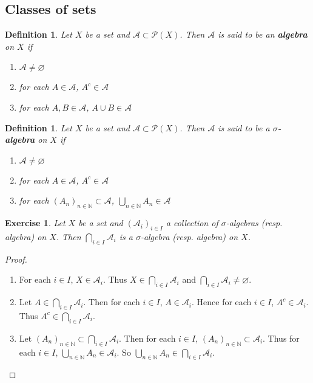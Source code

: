 \documentclass[12pt]{amsart}
\newtheorem{defn}[thm]{Definition}
\newtheorem{ex}[thm]{Exercise}
\newcommand{\sig}{\sigma}
\newcommand{\N}{\mathbb{N}}
\newcommand{\MA}{\mathcal{A}}
\newcommand{\MP}{\mathcal{P}}
\begin{document}
\subsection{Classes of sets}

\begin{defn}
Let $X$ be a set and $\MA \subset \MP(X)$. Then $\MA$ is said to be an \textbf{algebra} on $X$ if 
\begin{enumerate}
\item $\MA \neq \varnothing$
\item for each $A \in \MA$, $A^c \in \MA$
\item for each $A,B \in \MA$, $A \cup B \in \MA$
\end{enumerate}
\end{defn}

\begin{defn}
Let $X$ be a set and $\MA \subset \MP(X)$. Then $\MA$ is said to be a $\sigma$\textbf{-algebra} on $X$ if 
\begin{enumerate}
\item $\MA \neq \varnothing$
\item for each $A \in \MA$, $A^c \in \MA$
\item for each $(A_n)_{n \in \N} \subset \MA$, $\bigcup\limits_{n \in \N}A_n \in \MA$
\end{enumerate}
\end{defn}

\begin{ex}
Let $X$ be a set and $(\MA_i)_{i \in I}$ a collection of $\sig$-algebras (resp. algebra) on $X$. Then $\bigcap\limits_{i \in I}\MA_i$ is a $\sig$-algebra (resp. algebra) on $X$.
\end{ex}

\begin{proof}\
\begin{enumerate}
\item For each $i \in I$, $X \in \MA_i$. Thus $X \in \bigcap\limits_{i \in I}\MA_i$ and $\bigcap\limits_{i \in I}\MA_i \neq \varnothing$.
\item Let $A \in \bigcap\limits_{i \in I}\MA_i$. Then for each $i \in I$, $A \in \MA_i$. Hence for each $i \in I$, $A^c \in \MA_i$. Thus $A^c \in \bigcap\limits_{i \in I}\MA_i$. 
\item Let $(A_n)_{n \in \N} \subset \bigcap\limits_{i \in I}\MA_i$. Then for each $i \in I$, $(A_n)_{n \in \N} \subset \MA_i$. Thus for each $i \in I$, $\bigcup\limits_{n \in \N}A_n \in \MA_i$. So $\bigcup\limits_{n \in \N}A_n \in \bigcap\limits_{i \in I}\MA_i$.
\end{enumerate}
\end{proof}
\end{document}
